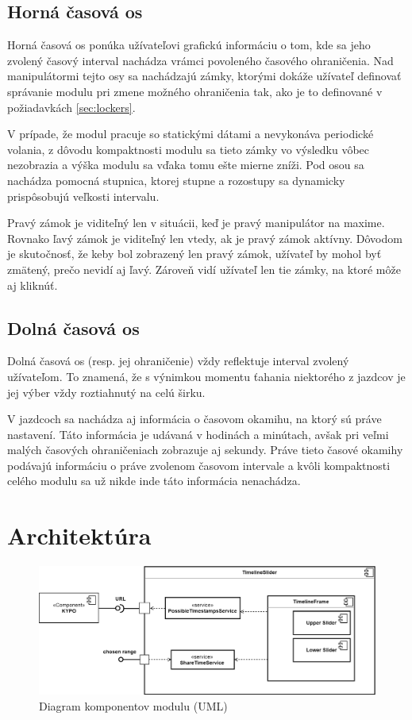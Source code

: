 \documentclass[
  digital, %
  twoside, %
  notable,   %
  nolof,   %
  nolot,   %
]{fithesis3}
\begin{document}
\subsection{Horná časová os}
Horná časová os ponúka užívateľovi grafickú informáciu o tom, kde sa jeho zvolený časový interval nachádza vrámci povoleného časového ohraničenia. Nad manipulátormi tejto osy sa nachádzajú zámky, ktorými dokáže užívateľ definovať správanie modulu pri zmene možného ohraničenia tak, ako je to definované v požiadavkách \ref{sec:lockers}.

V prípade, že modul pracuje so statickými dátami a nevykonáva periodické volania, z dôvodu kompaktnosti modulu sa tieto zámky vo výsledku vôbec nezobrazia a výška modulu sa vďaka tomu ešte mierne zníži. Pod osou sa nachádza pomocná stupnica, ktorej stupne a rozostupy sa dynamicky prispôsobujú veľkosti intervalu.

Pravý zámok je viditeľný len v situácii, keď je pravý manipulátor na maxime. Rovnako ľavý zámok je viditeľný len vtedy, ak je pravý zámok aktívny. Dôvodom je skutočnosť, že keby bol zobrazený len pravý zámok, užívateľ by mohol byť zmätený, prečo nevidí aj ľavý. Zároveň vidí užívateľ len tie zámky, na ktoré môže aj kliknúť.

\subsection{Dolná časová os}
Dolná časová os (resp. jej ohraničenie) vždy reflektuje interval zvolený užívateľom. To znamená, že s výnimkou momentu ťahania niektorého z jazdcov je jej výber vždy roztiahnutý na celú širku.

V jazdcoch sa nachádza aj informácia o časovom okamihu, na ktorý sú práve nastavení. Táto informácia je udávaná v hodinách a minútach, avšak pri veľmi malých časových ohraničeniach zobrazuje aj sekundy. Práve tieto časové okamihy podávajú informáciu o práve zvolenom časovom intervale a kvôli kompaktnosti celého modulu sa už nikde inde táto informácia nenachádza.

\section{Architektúra}
\begin{figure}[H]
	\center
	\includegraphics[width=1.0\linewidth]{component_diagram}
	\caption{Diagram komponentov modulu (UML)}
	\label{component_diagram}
\end{figure}
\end{document}
